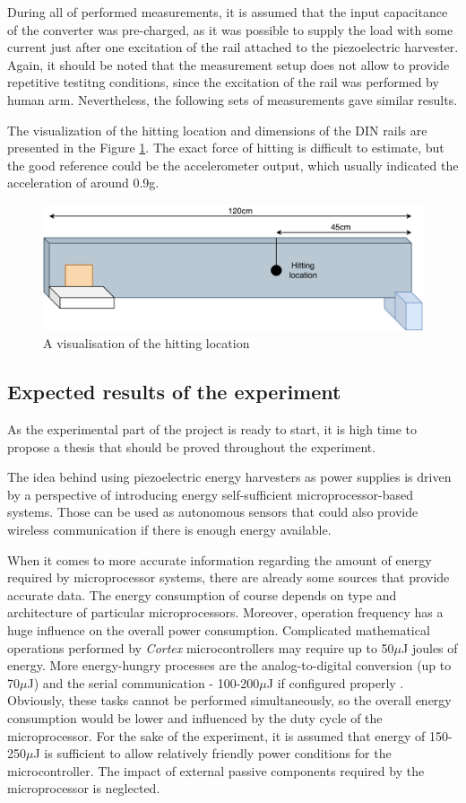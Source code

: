 \documentclass[12pt,a4paper]{article}
\begin{document}
During all of performed measurements, it is assumed that the input capacitance of the converter was pre-charged, as it was possible to supply the load with some current just after one excitation of the rail attached to the piezoelectric harvester. Again, it should be noted that the measurement setup does not allow to provide repetitive testitng conditions, since the excitation of the rail was performed by human arm. Nevertheless, the following sets of measurements gave similar results.
\par
The visualization of the hitting location and dimensions of the DIN rails are presented in the Figure \ref{fig:dinrail}. The exact force of hitting is difficult to estimate, but the good reference could be the accelerometer output, which usually indicated the acceleration of around 0.9g.

\begin{figure}[ht!]
\includegraphics[scale=0.55]{dinrail.pdf}
\caption{A visualisation of the hitting location}
\label{fig:dinrail}
\end{figure}

\subsection{Expected results of the experiment}
As the experimental part of the project is ready to start, it is high time to propose a thesis that should be proved throughout the experiment.
\par
The idea behind using piezoelectric energy harvesters as power supplies is driven by a perspective of introducing energy self-sufficient microprocessor-based systems. Those can be used as autonomous sensors that could also provide wireless communication if there is enough energy available.
\par
When it comes to more accurate information regarding the amount of energy required by microprocessor systems, there are already some sources \cite{joules} that provide accurate data. The energy consumption of course depends on type and architecture of particular microprocessors. Moreover, operation frequency has a huge influence on the overall power consumption. Complicated mathematical operations performed by \textit{Cortex} microcontrollers may require up to 50$\mu$J joules of energy. More energy-hungry processes are the analog-to-digital conversion (up to 70$\mu$J) and the serial communication - 100-200$\mu$J if configured properly \cite{joules}.
Obviously, these tasks cannot be performed simultaneously, so the overall energy consumption would be lower and influenced by the duty cycle of the microprocessor. For the sake of the experiment, it is assumed that energy of 150-250$\mu$J is sufficient to allow relatively friendly power conditions for the microcontroller. The impact of external passive components required by the microprocessor is neglected.
\end{document}
